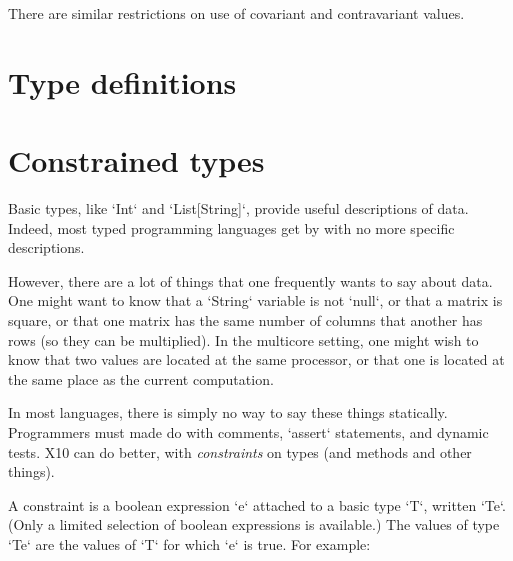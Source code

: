 {There are similar restrictions on use of covariant and contravariant values. 


\section{Type definitions}
\label{TypeDefs}




\section{Constrained types}
\label{ConstrainedTypes}
\label{DepType:DepType}
\label{DepTypes}



Basic types, like \xcd`Int` and \xcd`List[String]`, provide useful
descriptions of data.  Indeed, most typed programming languages get by with no
more specific descriptions.

However, there are a lot of things that one frequently wants to say about
data.  One might want to know that a \xcd`String` variable is not \xcd`null`,
or that a matrix is square, or that one matrix has the same number of columns
that another has rows (so they can be multiplied).  In the multicore setting,
one might wish to know that two values are located at the same processor, or
that one is located at the same place as the current computation.

In most languages, there is simply no way to say these things statically.
Programmers must made do with comments, \xcd`assert` statements, and dynamic
tests.  X10 can do better, with {\em constraints} on types (and methods and
other things).

A constraint is a boolean expression \xcd`e` attached to a basic type \xcd`T`,
written \xcd`T{e}`.  (Only a limited selection of boolean expressions is
available.)  The values of type \xcd`T{e}` are the values of \xcd`T` for which
\xcd`e` is true.  For example: 

}

